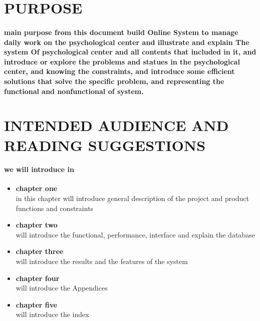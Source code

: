 \documentclass[../Psychological_system_web_application.tex]{subfiles}
\begin{document}
			
		\section{PURPOSE}
			
			\paragraph{ main purpose from this document build Online System to manage daily work on the psychological center and illustrate and explain The system Of psychological center and all contents that included in it, and introduce or explore the problems and statues in the psychological center, and knowing the constraints, and introduce some efficient solutions that solve the specific problem, and representing the functional and nonfunctional of system.}
			
			
		
		\section{INTENDED AUDIENCE AND READING SUGGESTIONS}
			\paragraph*{we will introduce in }
				\begin{itemize}
				\item \textbf{chapter one}\\
					in this chapter will introduce general description of the project and product functions and constraints 
				\item \textbf{chapter two}\\
					will introduce the functional, performance, interface  and explain the database
				\item \textbf{chapter three}\\
					will introduce the results and the features of the system  
				\item \textbf{chapter four}\\
					will introduce the Appendices 
				\item \textbf{chapter five}\\
					will introduce the index
			\end{itemize}			
\end{document}
